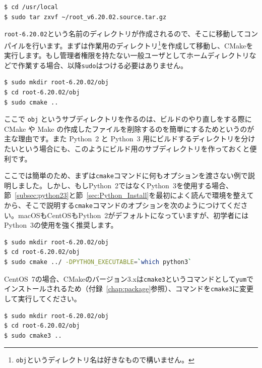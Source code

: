 {\begin{lstlisting}[language=bash]
$ cd /usr/local
$ sudo tar zxvf ~/root_v6.20.02.source.tar.gz
\end{lstlisting}

\texttt{root-6.20.02}という名前のディレクトリが作成されるので、そこに移動してコンパイルを行います。まずは作業用のディレクトリ\footnote{\texttt{obj}というディレクトリ名は好きなもので構いません。}を作成して移動し、CMakeを実行します。もし管理者権限を持たない一般ユーザとしてホームディレクトリなどで作業する場合、以降\texttt{sudo}はつける必要はありません。

\begin{lstlisting}[language=bash]
$ sudo mkdir root-6.20.02/obj
$ cd root-6.20.02/obj
$ sudo cmake ..
\end{lstlisting}

ここで \texttt{obj} というサブディレクトリを作るのは、ビルドのやり直しをする際に CMake や Make の作成したファイルを削除するのを簡単にするためというのが主な理由です。また Python~2 と Python~3 用にビルドするディレクトリを分けたいという場合にも、このようにビルド用のサブディレクトリを作っておくと便利です。

ここでは簡単のため、まずは\texttt{cmake}コマンドに何もオプションを渡さない例で説明しました。しかし、もしPython~2ではなくPython~3を使用する場合、節~\ref{subsec:python23}と節~\ref{sec:Python_Install}を最初によく読んで環境を整えてから、そこで説明する\texttt{cmake}コマンドのオプションを次のようにつけてください。macOSもCentOSもPython~2がデフォルトになっていますが、初学者にはPython~3の使用を強く推奨します。
\begin{lstlisting}[language=bash]
$ sudo mkdir root-6.20.02/obj
$ cd root-6.20.02/obj
$ sudo cmake ../ -DPYTHON_EXECUTABLE=`which python3`
\end{lstlisting}

CentOS~7の場合、CMakeのバージョン3.xは\texttt{cmake3}というコマンドとして\texttt{yum}でインストールされるため（付録~\ref{chap:package}参照）、コマンドを\texttt{cmake3}に変更して実行してください。

\begin{lstlisting}[language=bash]
$ sudo mkdir root-6.20.02/obj
$ cd root-6.20.02/obj
$ sudo cmake3 ..
\end{lstlisting}

}
